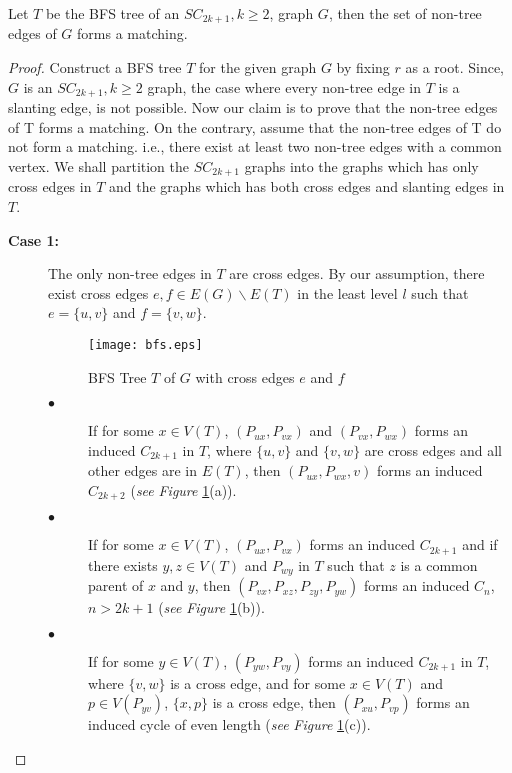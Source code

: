 \documentclass[runningheads]{llncs}
\begin{document}
\begin{lemma}
\label{matching}
 Let $T$ be the BFS tree of an $SC_{2k+1}, k \geq 2$, graph $G$, then the set of non-tree edges of $G$ forms a matching.
\end{lemma}
\begin{proof}
Construct a BFS tree $T$ for the given graph $G$ by fixing $r$ as a root. Since, $G$ is an $SC_{2k+1}, k \geq 2$ graph, the case where every non-tree edge in $T$ is a slanting edge, is not possible. Now our claim is to prove that the non-tree edges of T forms a matching. On the contrary, assume that the non-tree edges of T do not form a matching. i.e., there exist at least two non-tree edges with a common vertex. We shall partition the $SC_{2k+1}$ graphs into the graphs which has only cross edges in $T$ and the graphs which has both cross edges and slanting edges in $T$.

\begin{description}
\item[\bf{Case 1:}] The only non-tree edges in $T$ are cross edges. By our assumption,  there exist cross edges $e, f \in E(G)\backslash E(T)$ in the least level $l$ such that $e = \{u, v\}$ and $f = \{v, w\}$.

\begin{figure}[h]
\begin{center}
\texttt{[image: bfs.eps]}
\caption{BFS Tree $T$ of $G$ with cross edges $e$ and $f$}
\label{bfs1}
\end{center}
 \vspace{-0.7cm}
\end{figure}


\begin{description}
\item[$\bullet$] If for some $x \in V(T)$, $(P_{ux}, P_{vx})$ and $(P_{vx}, P_{wx})$ forms an induced $C_{2k+1}$ in $T$, where $\{u,v\}$ and $\{v,w\}$ are cross edges and all other edges are in $E(T)$, then $(P_{ux}, P_{wx}, v)$ forms an induced $C_{2k+2}$ (\emph{see} \emph{Figure }\ref{bfs1}(a)). 

\item[$\bullet$] If for some $x \in V(T)$, $(P_{ux}, P_{vx})$ forms an induced $C_{2k+1}$ and if there exists $y, z \in V(T)$ and $P_{wy}$ in $T$ such that $z$ is a common parent of $x$ and $y$, then $(P_{vx}, P_{xz}, P_{zy}, P_{yw})$ forms an induced $C_n$, $n > 2k+1$  (\emph{see} \emph{Figure }\ref{bfs1}(b)). 

\item[$\bullet$] If for some $y\in V(T)$, $(P_{yw},P_{vy})$ forms an induced $C_{2k+1}$ in $T$, where $\{v,w\}$ is a cross edge, and for some $x \in V(T)$ and $p \in V(P_{yv})$, $\{x,p\}$ is a cross edge, then $(P_{xu},P_{vp})$ forms an induced cycle of even length (\emph{see} \emph{Figure }\ref{bfs1}(c)).
\end{description}



\end{description}
\end{proof}
\end{document}
